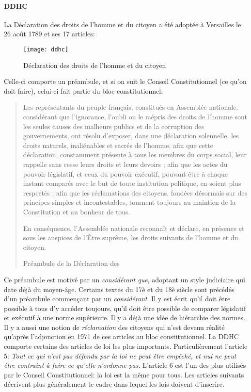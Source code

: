 \documentclass[math]{cours}
\begin{document}
\paragraph{DDHC}
La Déclaration des droits de l'homme et du citoyen a été adoptée à Versailles le 26 août 1789 et ses 17 articles:
\begin{figure}[h!]
	\centering
	\texttt{[image: ddhc]}
	\caption{Déclaration des droits de l'homme et du citoyen}
	\label{fig:ddhc}
\end{figure}
Celle-ci comporte un préambule, et si on suit le Conseil Constitutionnel (ce qu'on doit faire), celui-ci fait partie du bloc constitutionnel:
\begin{quote}
	Les représentants du peuple français, constitués en Assemblée nationale, considérant que l'ignorance, l'oubli ou le mépris des droits de l'homme sont les seules causes des malheurs publics et de la corruption des gouvernements, ont résolu d'exposer, dans une déclaration solennelle, les droits naturels, inaliénables et sacrés de l'homme, afin que cette déclaration, constamment présente à tous les membres du corps social, leur rappelle sans cesse leurs droits et leurs devoirs ; afin que les actes du pouvoir législatif, et ceux du pouvoir exécutif, pouvant être à chaque instant comparés avec le but de toute institution politique, en soient plus respectés ; afin que les réclamations des citoyens, fondées désormais sur des principes simples et incontestables, tournent toujours au maintien de la Constitution et au bonheur de tous.
	\smallskip

	En conséquence, l'Assemblée nationale reconnaît et déclare, en présence et sous les auspices de l'Être suprême, les droits suivants de l'homme et du citoyen.
	\begin{flushright}
		Préambule de la Déclaration des
	\end{flushright}

\end{quote}
Ce préambule est motivé par un \emph{considérant que}, adoptant un style judiciaire qui date déjà du moyen-âge.
Certains textes du 17è et du 18è siècle sont précédés d'un préambule commençant par un \emph{considérant}.
Il y est écrit qu'il doit être possible à tous d'y accéder toujours, qu'il doit être possible de comparer législatif et exécutif à une norme supérieure.
Il y a déjà une idée de hiérarchie des normes.
Il y a aussi une notion de \emph{réclamation} des citoyens qui n'est devenu réalité qu'après l'adjonction en 1971 de ces articles au bloc constitutionnel.
La DDHC comporte certains des articles de loi les plus importants. Particulièrement l'article 5: \og\emph{Tout ce qui n'est pas défendu par la loi ne peut être empêché, et nul ne peut être contraint à faire ce qu'elle n'ordonne pas.}\fg
L'article 6 est l'un des plus utilisés par le Conseil Constitutionnel: la loi est la même pour tous.
Les articles suivants décrivent plus généralement le cadre dans lequel les lois doivent d'inscrire.
\end{document}
